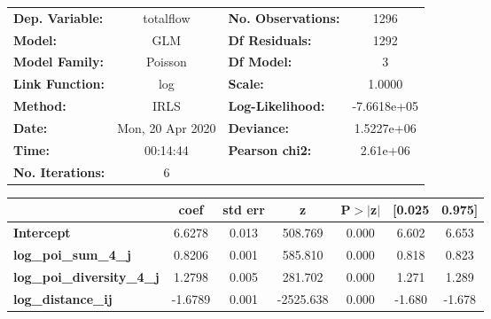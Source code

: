 \begin{center}
\begin{tabular}{lclc}
\toprule
\textbf{Dep. Variable:}            &    totalflow     & \textbf{  No. Observations:  } &      1296    \\
\textbf{Model:}                    &       GLM        & \textbf{  Df Residuals:      } &      1292    \\
\textbf{Model Family:}             &     Poisson      & \textbf{  Df Model:          } &         3    \\
\textbf{Link Function:}            &       log        & \textbf{  Scale:             } &     1.0000   \\
\textbf{Method:}                   &       IRLS       & \textbf{  Log-Likelihood:    } & -7.6618e+05  \\
\textbf{Date:}                     & Mon, 20 Apr 2020 & \textbf{  Deviance:          } &  1.5227e+06  \\
\textbf{Time:}                     &     00:14:44     & \textbf{  Pearson chi2:      } &   2.61e+06   \\
\textbf{No. Iterations:}           &        6         & \textbf{                     } &              \\
\bottomrule
\end{tabular}
\begin{tabular}{lcccccc}
                                   & \textbf{coef} & \textbf{std err} & \textbf{z} & \textbf{P$> |$z$|$} & \textbf{[0.025} & \textbf{0.975]}  \\
\midrule
\textbf{Intercept}                 &       6.6278  &        0.013     &   508.769  &         0.000        &        6.602    &        6.653     \\
\textbf{log\_poi\_sum\_4\_j}       &       0.8206  &        0.001     &   585.810  &         0.000        &        0.818    &        0.823     \\
\textbf{log\_poi\_diversity\_4\_j} &       1.2798  &        0.005     &   281.702  &         0.000        &        1.271    &        1.289     \\
\textbf{log\_distance\_ij}         &      -1.6789  &        0.001     & -2525.638  &         0.000        &       -1.680    &       -1.678     \\
\bottomrule
\end{tabular}
\end{center}